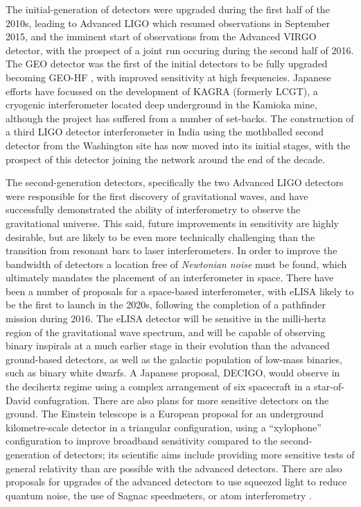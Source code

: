 The initial-generation of detectors were upgraded during the first
half of the 2010s, leading to Advanced LIGO\cite{2015CQGra..32g4001L}
which resumed observations in September 2015, and the imminent start
of observations from the Advanced VIRGO
detector\cite{2015CQGra..32b4001A}, with the prospect of a joint run
occuring during the second half of 2016. The GEO detector was the
first of the initial detectors to be fully upgraded becoming GEO-HF
\cite{2006CQGra..23S.207W}, with improved sensitivity at high
frequencies. Japanese efforts have focussed on the development of
KAGRA (formerly LCGT), a cryogenic interferometer located deep
underground in the Kamioka mine\cite{1999IJMPD...8..557K}, although
the project has suffered from a number of set-backs. The construction
of a third LIGO detector interferometer in India using the mothballed
second detector from the Washington site has now moved into its
initial stages, with the prospect of this detector joining the network
around the end of the decade.

The second-generation detectors, specifically the two Advanced LIGO
detectors were responsible for the first discovery of gravitational
waves\cite{2016PhRvL.116m1103A}, and have successfully demonstrated
the ability of interferometry to observe the gravitational
universe. This said, future improvements in sensitivity are highly
desirable, but are likely to be even more technically challenging than
the transition from resonant bars to laser interferometers. In order
to improve the bandwidth of detectors a location free of
\emph{Newtonian noise} must be found, which ultimately mandates the
placement of an interferometer in space. There have been a number of
proposals for a space-based interferometer, with
eLISA\cite{2013GWN.....6....4A} likely to be the first to launch in
the 2020s, following the completion of a pathfinder mission during
2016\cite{2015JPhCS.610a2005A}. The eLISA detector will be sensitive
in the milli-hertz region of the gravitational wave spectrum, and will
be capable of observing binary inspirals at a much earlier stage in
their evolution than the advanced ground-based detectors, as well as
the galactic population of low-mass binaries, such as binary white
dwarfs. A Japanese proposal, DECIGO\cite{2011CQGra..28i4011K}, would
observe in the decihertz regime using a complex arrangement of six
spacecraft in a star-of-David confugration. There are also plans for
more sensitive detectors on the ground. The Einstein telescope is a
European proposal for an underground kilometre-scale detector in a
triangular configuration, using a ``xylophone'' configuration to
improve broadband sensitivity compared to the second-generation of
detectors; its scientific aims include providing more sensitive tests
of general relativity than are possible with the advanced
detectors\cite{2012CQGra..29l4013S}. There are also proposals for
upgrades of the advanced detectors to use squeezed light to reduce
quantum noise\cite{2015PhRvD..91f2005M}, the use of Sagnac
speedmeters\cite{2014MUPB...69..519V,2002gr.qc....11088K}, or atom
interferometry\cite{2013PhRvL.110q1102G,2016PhRvD..93b1101C,2008PhRvD..78l2002D}
.


